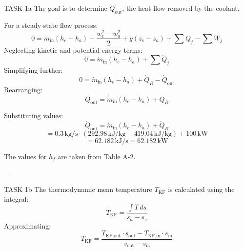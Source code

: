 TASK 1a  
The goal is to determine \( \dot{Q}_{\text{out}} \), the heat flow removed by the coolant.  

For a steady-state flow process:  
\[
0 = \dot{m}_{\text{in}} (h_e - h_a) + \frac{w_e^2 - w_a^2}{2} + g(z_e - z_a) + \sum \dot{Q}_j - \sum \dot{W}_j
\]  
Neglecting kinetic and potential energy terms:  
\[
0 = \dot{m}_{\text{in}} (h_e - h_a) + \sum \dot{Q}_j
\]  
Simplifying further:  
\[
0 = \dot{m}_{\text{in}} (h_e - h_a) + \dot{Q}_R - \dot{Q}_{\text{out}}
\]  
Rearranging:  
\[
\dot{Q}_{\text{out}} = \dot{m}_{\text{in}} (h_e - h_a) + \dot{Q}_R
\]  

Substituting values:  
\[
\dot{Q}_{\text{out}} = \dot{m}_{\text{in}} (h_e - h_a) + \dot{Q}_R
\]  
\[
= 0.3 \, \text{kg/s} \cdot (292.98 \, \text{kJ/kg} - 419.04 \, \text{kJ/kg}) + 100 \, \text{kW}
\]  
\[
= 62.182 \, \text{kJ/s} = 62.182 \, \text{kW}
\]  

The values for \( h_f \) are taken from Table A-2.  

---

TASK 1b  
The thermodynamic mean temperature \( T_{\text{KF}} \) is calculated using the integral:  
\[
T_{\text{KF}} = \frac{\int T \, ds}{s_a - s_e}
\]  
Approximating:  
\[
T_{\text{KF}} = \frac{T_{\text{KF,out}} \cdot s_{\text{out}} - T_{\text{KF,in}} \cdot s_{\text{in}}}{s_{\text{out}} - s_{\text{in}}}
\]  